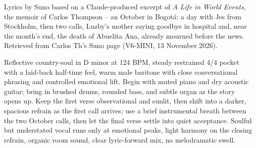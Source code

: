 
\label{sec:october-calls}
\begin{notes}
Lyrics by Suno based on a Claude-produced excerpt of \emph{A Life in World Events}, the memoir of Carlos Thompson -- an October in Bogotá: a day with Jes from Stockholm, then two calls, Luzby's mother saying goodbye in hospital and, near the month's end, the death of Abuelita Ana, already mourned before the news. Retrieved from Carlos Th's Suno page (V6-MINI, 13 November 2026).
\end{notes}
\begin{style}
Reflective country-soul in D minor at 124 BPM, steady restrained 4/4 pocket with a laid-back half-time feel, warm male baritone with close conversational phrasing and controlled emotional lift. Begin with muted piano and dry acoustic guitar; bring in brushed drums, rounded bass, and subtle organ as the story opens up. Keep the first verse observational and sunlit, then shift into a darker, spacious refrain as the first call arrives; use a brief instrumental breath between the two October calls, then let the final verse settle into quiet acceptance. Soulful but understated vocal runs only at emotional peaks, light harmony on the closing refrain, organic room sound, clear lyric-forward mix, no melodramatic swell.
\end{style}
